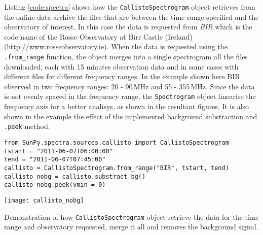 Listing \ref{code:spectra} shows how the \texttt{CallistoSpectrogram} object retrieves
from the online data archive the files that are between the time range specified and
the observatory of interest.  In this case the data is requested from \textit{BIR} which is the code name of the
Rosse Observatory at Birr Castle (Ireland)(\url{http://www.rosseobservatory.ie}).
When the data is requested using the \texttt{.from\_range} function, the object merges
into a single spectrogram all the files downloaded, each with 15 minutes observation data 
and in some cases with different files for different frequency ranges.  
In the example shown here BIR observed in two frequency ranges: 20 - 90\,MHz and 55 - 355\,MHz.
Since the data is not evenly spaced in the frequency range, the \texttt{Spectrogram} object
linearise the frequency axis for a better analisys, as shown in the resultant figures.
It is also shown in the example the effect of the implemented background substraction and
\texttt{.peek} method.

\begin{listing}[H]
\begin{verbatim}
from SunPy.spectra.sources.callisto import CallistoSpectrogram
tstart = "2011-06-07T06:00:00"
tend = "2011-06-07T07:45:00"
callisto = CallistoSpectrogram.from_range("BIR", tstart, tend)
callisto_nobg = callisto.substract_bg()
callisto_nobg.peek(vmin = 0)
\end{verbatim}
\begin{center}
\texttt{[image: callisto\_nobg]}
\end{center}
\caption{Demonstration of how \texttt{CallistoSpectrogram} object retrieve the data
for the time range and observatory requested, merge it all and removes the background
signal.}
\label{code:spectra}
\end{listing}


